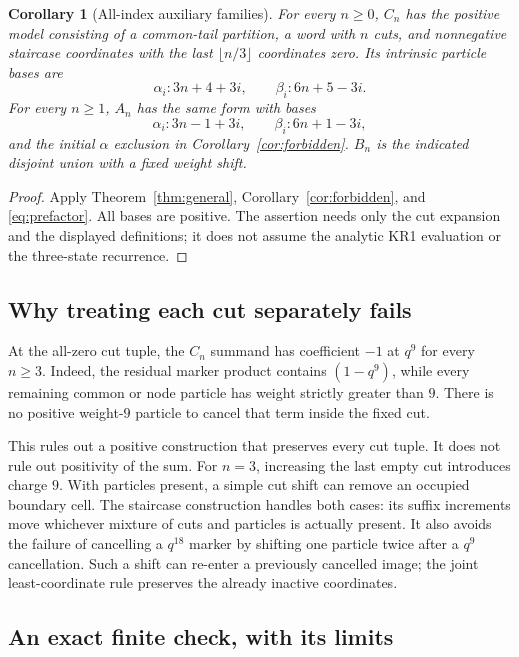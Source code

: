 \documentclass[11pt,a4paper]{article}
\newtheorem{corollary}[theorem]{Corollary}
\theoremstyle{definition}
\begin{document}
\begin{corollary}[All-index auxiliary families]\label{cor:alln}
For every $n\ge0$, $C_n$ has the positive model consisting of a common-tail
partition, a word with $n$ cuts, and nonnegative staircase coordinates with
the last $\lfloor n/3\rfloor$ coordinates zero. Its intrinsic particle bases are
\[
\alpha_i:3n+4+3i,\qquad \beta_i:6n+5-3i.
\]
For every $n\ge1$, $A_n$ has the same form with bases
\[
\alpha_i:3n-1+3i,\qquad \beta_i:6n+1-3i,
\]
and the initial $\alpha$ exclusion in Corollary~\ref{cor:forbidden}.
$B_n$ is the indicated disjoint union with a fixed weight shift.
\end{corollary}
\begin{proof}
Apply Theorem~\ref{thm:general}, Corollary~\ref{cor:forbidden}, and
\eqref{eq:prefactor}. All bases are positive. The assertion needs only
the cut expansion and the displayed definitions; it does not assume
the analytic KR1 evaluation or the three-state recurrence.
\end{proof}

\subsection{Why treating each cut separately fails}

At the all-zero cut tuple, the $C_n$ summand has coefficient $-1$ at
$q^9$ for every $n\ge3$. Indeed, the residual marker product contains
$(1-q^9)$, while every remaining common or node particle has weight
strictly greater than $9$. There is no positive weight-$9$ particle to
cancel that term inside the fixed cut.

This rules out a positive construction that preserves every cut tuple.
It does not rule out positivity of the sum. For $n=3$, increasing the last
empty cut introduces charge $9$. With particles present, a simple cut shift
can remove an occupied boundary cell. The staircase construction handles
both cases: its suffix increments move whichever mixture of cuts and particles
is actually present. It also avoids the failure of cancelling a $q^{18}$
marker by shifting one particle twice after a $q^9$ cancellation. Such a shift
can re-enter a previously cancelled image; the joint least-coordinate rule
preserves the already inactive coordinates.

\subsection{An exact finite check, with its limits}
\end{document}
